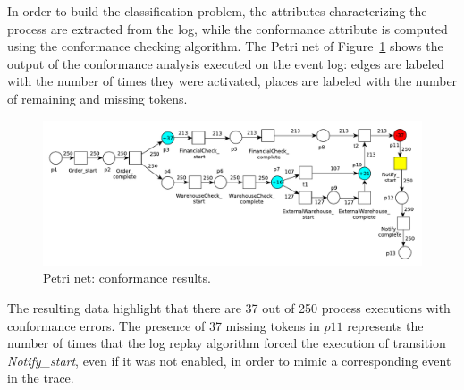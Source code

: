 \documentclass{llncs}
\begin{document}
In order to build the classification problem, the attributes characterizing the process are extracted from the log, while the conformance attribute is computed using the conformance checking algorithm. The Petri net of Figure~\ref{replayResult}  shows the output of the conformance analysis executed on the event log: edges are labeled with the number of times they were activated, places are labeled with the number of remaining and missing tokens.

\begin{figure}[h]
\includegraphics[width=360pt]
{./items/Sales_PN_resultMod.pdf}
\caption{Petri net: conformance results.}
\label{replayResult}
\end{figure}

The resulting data highlight  that there are 37 out of 250 process executions with conformance errors. The presence of 37 missing tokens in $p11$ represents  the number of times that the log replay  algorithm forced the execution of transition \emph{Notify\_start}, even if it was not enabled, in order to mimic a corresponding event in the trace.
\end{document}
